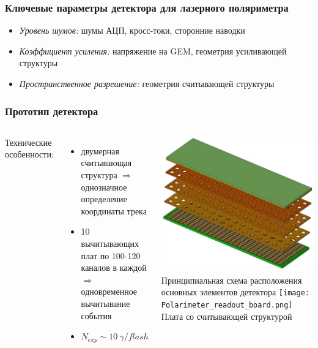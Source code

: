 \documentclass[14pt]{beamer}
\begin{document}
\begin{frame}[t]
\frametitle{Ключевые параметры детектора для лазерного поляриметра}
		\begin{itemize}
				\item \textit{Уровень шумов:} шумы АЦП, кросс-токи, сторонние наводки
				\item  \textit{Коэффициент усиления:} напряжение на GEM, геометрия усиливающей структуры
				\item  \textit{Пространственное разрешение:} геометрия считывающей структуры 
		\end{itemize}
\end{frame}


\begin{frame}[t]
\frametitle{Прототип детектора}
\vspace{0pt}
\begin{columns}
	Технические особенности:
	\begin{minipage}[t][1\textheight]{\linewidth}
		\small{\begin{itemize}
				\item двумерная считывающая структура $\Rightarrow$ однозначное определение координаты трека
				\item 10 вычитывающих плат по 100-120 каналов в каждой $\Rightarrow$ одновременное вычитывание события
				\item $N_{exp} \sim 10~\gamma /flash$
				
		\end{itemize}}
	\end{minipage}%
	\begin{minipage}[t][1\textheight]{\linewidth}
		\centering
		\includegraphics[width=0.8\linewidth, height = 0.4\textheight]{GEM_model.pdf}
		\newline \tiny{Принципиальная схема расположения основных элементов детектора}
		\texttt{[image: Polarimeter\_readout\_board.png]} 
		\newline \tiny{Плата со считывающей структурой}
	\end{minipage}%
\end{columns}
\end{frame}
\end{document}

